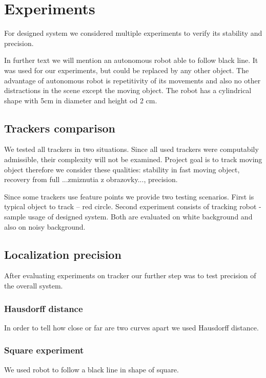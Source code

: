 \chapter{Experiments} For designed system we considered multiple experiments to
verify its stability and precision.

In further text we will mention an autonomous robot able to follow black line.
It was used for our experiments, but could be replaced by any other object. The
advantage of autonomous robot is repetitivity of its movements and also no
other distractions in the scene except the moving object. The robot has a
cylindrical shape with 5cm in diameter and height od 2 cm.

\section{Trackers comparison} We tested all trackers in two situations. Since
all used trackers were computabily admissible, their complexity will not be
examined. Project goal is to track moving object therefore we consider these
qualities: stability in fast moving object, recovery from full ...zmiznutia z
obrazovky..., precision.

Since some trackers use feature points we provide two testing scenarios. First
is typical object to track -- red circle. Second experiment consists of
tracking robot - sample usage of designed system. Both are evaluated on white
background and also on noisy background.

\section{Localization precision} After evaluating experiments on tracker our
further step was to test precision of the overall system.

\subsection{Hausdorff distance} In order to tell how close or far are two
curves apart we used Hausdorff distance.

\subsection{Square experiment} We used robot to follow a black line in shape of
square. 

